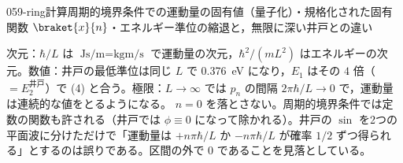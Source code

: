 \documentclass[uplatex,dvipdfmx,a4paper,11pt]{jsarticle}
\begin{document}
\begin{mondai}{059-ring}{計算}{周期的境界条件での運動量の固有値（量子化）・規格化された固有関数 $\braket{x}{n}$・エネルギー準位の縮退と，無限に深い井戸との違い}
\begin{tadashii}
\begin{ronten}
\end{ronten}
\kenzan 次元：$\hbar/L$ は $\unit{\joule\second\per\metre}=\unit{\kilogram\metre\per\second}$ で運動量の次元，$\hbar^{2}/(mL^{2})$ はエネルギーの次元。数値：井戸の最低準位は同じ $L$ で \qty{0.376}{\electronvolt} になり，$E_{1}$ はその $4$ 倍（$=E_{2}^{\text{井戸}}$）で (4) と合う。極限：$L\to\infty$ では $p_{n}$ の間隔 $2\pi\hbar/L\to0$ で，運動量は連続的な値をとるようになる。
\tsumazuki $n=0$ を落とさない。周期的境界条件では定数の関数も許される（井戸では $\phi\equiv0$ になって除かれる）。井戸の $\sin$ を2つの平面波に分けただけで「運動量は $+n\pi\hbar/L$ か $-n\pi\hbar/L$ が確率 $1/2$ ずつ得られる」とするのは誤りである。区間の外で $0$ であることを見落としている。
\end{tadashii}
\end{mondai}
\end{document}
